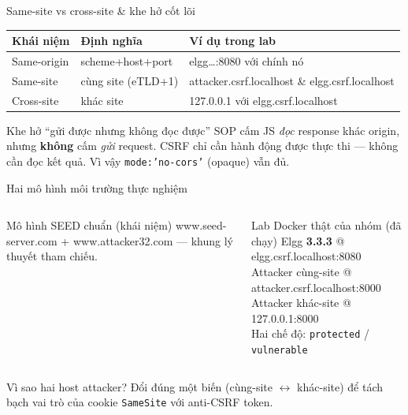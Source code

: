 \documentclass[11pt,aspectratio=169]{beamer}
\begin{document}
\begin{frame}{Same-site vs cross-site \& khe hở cốt lõi}
  \footnotesize
  \begin{tabular}{lll}
    \toprule
    \textbf{Khái niệm} & \textbf{Định nghĩa} & \textbf{Ví dụ trong lab}\\
    \midrule
    Same-origin & scheme+host+port & elgg\ldots:8080 với chính nó\\
    Same-site & cùng site (eTLD+1) & attacker.csrf.localhost \& elgg.csrf.localhost\\
    Cross-site & khác site & 127.0.0.1 với elgg.csrf.localhost\\
    \bottomrule
  \end{tabular}
  \vfill
  \begin{alertblock}{Khe hở ``gửi được nhưng không đọc được''}
    \footnotesize SOP cấm JS \emph{đọc} response khác origin, nhưng \textbf{không} cấm \emph{gửi} request. CSRF chỉ cần hành động được thực thi — không cần đọc kết quả. Vì vậy \texttt{mode:'no-cors'} (opaque) vẫn đủ.
  \end{alertblock}
\end{frame}

\begin{frame}{Hai mô hình môi trường thực nghiệm}
  \footnotesize
  \begin{columns}[t]
      \begin{block}{Mô hình SEED chuẩn (khái niệm)}
        \scriptsize www.seed-server.com + www.attacker32.com — khung lý thuyết tham chiếu.
      \end{block}
      \begin{exampleblock}{Lab Docker thật của nhóm (đã chạy)}
        \scriptsize Elgg \textbf{3.3.3} @ elgg.csrf.localhost:8080\\
        Attacker cùng-site @ attacker.csrf.localhost:8000\\
        Attacker khác-site @ 127.0.0.1:8000\\
        Hai chế độ: \texttt{protected} / \texttt{vulnerable}
      \end{exampleblock}
  \end{columns}
  \vfill
  \begin{block}{Vì sao hai host attacker?}
    \scriptsize Đổi \alert{đúng một biến} (cùng-site $\leftrightarrow$ khác-site) để tách bạch vai trò của cookie \texttt{SameSite} với anti-CSRF token.
  \end{block}
\end{frame}
\end{document}

